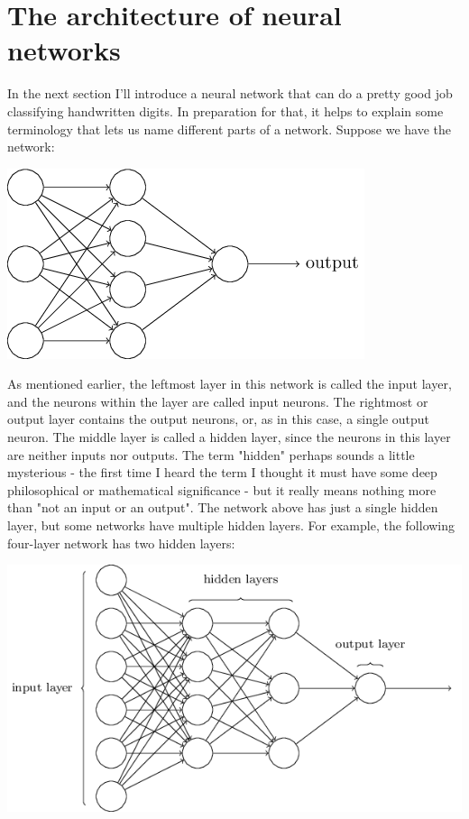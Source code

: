 \documentclass[a4paper,12pt]{report}%
\begin{document}
\section{The architecture of neural networks}
In the next section I'll introduce a neural network that can do a pretty good job classifying handwritten digits. In preparation for that, it helps to explain some terminology that lets us name different parts of a network. Suppose we have the network:
\begin{center}
 \includegraphics[width=0.5\linewidth]{images/tikz10.png}
\end{center}

As mentioned earlier, the leftmost layer in this network is called the input layer, and the neurons within the layer are called input neurons. The rightmost or output layer contains the output neurons, or, as in this case, a single output neuron. The middle layer is called a hidden layer, since the neurons in this layer are neither inputs nor outputs. The term "hidden" perhaps sounds a little mysterious - the first time I heard the term I thought it must have some deep philosophical or mathematical significance - but it really means nothing more than "not an input or an output". The network above has just a single hidden layer, but some networks have multiple hidden layers. For example, the following four-layer network has two hidden layers:
\begin{center}
 \includegraphics[width=0.8\linewidth]{images/tikz11.png}
\end{center}
\end{document}
